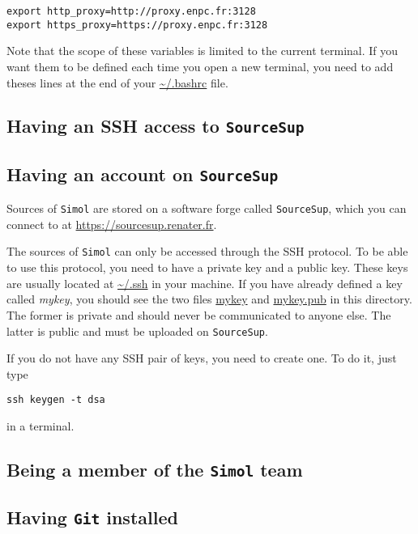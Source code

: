 \documentclass[12pt]{book}
\newcommand{\Git}{\texttt{Git}\xspace}
\newcommand{\Simol}{\texttt{Simol}\xspace}
\newcommand{\SourceSup}{\texttt{SourceSup}\xspace}
\newcommand{\urlSourceSup}{\href{https://sourcesup.renater.fr}{https://sourcesup.renater.fr}}
\begin{document}
\lstset{language=bash} 
\begin{lstlisting}
export http_proxy=http://proxy.enpc.fr:3128
export https_proxy=https://proxy.enpc.fr:3128
\end{lstlisting}
Note that the scope of these variables is limited to the current terminal. If you want them to be defined each time you open a new terminal, you need to add theses lines at the end of your \url{~/.bashrc} file.

\subsection{Having an SSH access to \SourceSup}


\subsection{Having an account on \SourceSup}

Sources of \Simol are stored on a software forge called \SourceSup, which you can connect to at \urlSourceSup.  

The sources of \Simol can only be accessed through the SSH protocol. To be able to use this protocol, you need to have a private key and a public key. These keys are usually located at \url{~/.ssh} in your machine. If you have already defined a key called \textit{mykey}, you should see the two files \url{mykey} and \url{mykey.pub} in this directory. The former is private and should never be communicated to anyone else. The latter is public and must be uploaded on \SourceSup. 

If you do not have any SSH pair of keys, you need to create one. To do it, just type
\lstset{language=bash} 
\begin{lstlisting}
ssh keygen -t dsa
\end{lstlisting}
in a terminal.

\subsection{Being a member of the \Simol team}






\subsection{Having \Git installed}
\end{document}
